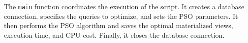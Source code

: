 The \texttt{main} function coordinates the execution of the script. It creates a database connection, specifies the queries to optimize, and sets the PSO parameters. It then performs the PSO algorithm and saves the optimal materialized views, execution time, and CPU cost. Finally, it closes the database connection.


